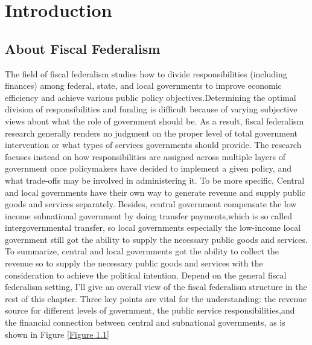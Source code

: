 
\chapter{Introduction} \label{chapter1:Introduction}

\section{About Fiscal Federalism}
The field of fiscal federalism studies how to divide responsibilities (including finances) among federal, state, and local governments to improve economic efficiency and achieve various public policy objectives.Determining the optimal division of responsibilities and funding is difficult because of varying subjective views about what the role of government should be. As a result, fiscal federalism research generally renders no judgment on the proper level of total government intervention or what types of services governments should provide. The research focuses instead on how responsibilities are assigned across multiple layers of government once policymakers have decided to implement a given policy, and what trade-offs may be involved in administering it. To be more specific, Central and local governments have their own way to generate revenue and supply public goods and services separately. Besides, central government compensate the low income subnational government by doing transfer payments,which is so called intergovernmental transfer, so local governments especially the low-income local government still got the ability to supply the necessary public goods and services. To summarize, central and local governments got the ability to collect the revenue so to supply the necessary public goods and services with the consideration to achieve the political intention. Depend on the general fiscal federalism setting, I'll give an overall view of the fiscal federalism structure in the rest of this chapter. Three key points are vital for the understanding: the revenue source for different levels of government, the public service responsibilities,and the financial connection between central and subnational governments, as is shown in Figure \ref*{Figure 1.1}

